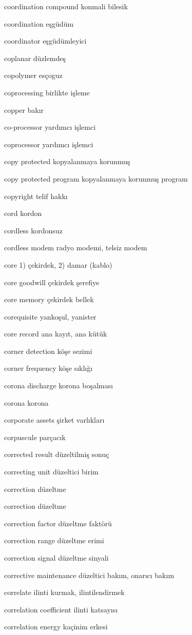 \documentclass[12pt,fleqn]{article}\usepackage{../../common}
\begin{document}
coordination compound konmali bilesik

coordination eşgüdüm

coordinator eşgüdümleyici

coplanar düzlemdeş

copolymer esçoguz

coprocessing birlikte işleme

copper bakır

co-processor yardımcı işlemci

coprocessor yardımcı işlemci

copy protected kopyalanmaya korunmuş

copy protected program kopyalanmaya korunmuş program

copyright telif hakkı

cord kordon

cordless kordonsuz

cordless modem radyo modemi, telsiz modem

core 1) çekirdek, 2) damar (kablo)

core goodwill çekirdek şerefiye

core memory çekirdek bellek

corequisite yankoşul, yanister

core record ana kayıt, ana kütük

corner detection köşe sezimi

corner frequency köşe sıklığı

corona discharge korona boşalması

corona korona

corporate assets şirket varlıkları

corpuscule parçacık

corrected result düzeltilmiş sonuç

correcting unit düzeltici birim

correction düzeltme

correction düzeltme

correction factor düzeltme faktörü

correction range düzeltme erimi

correction signal düzeltme sinyali

corrective maintenance düzeltici bakım, onarıcı bakım

correlate ilinti kurmak, ilintilendirmek

correlation coefficient ilinti katsayısı

correlation energy kaçinim erkesi
\end{document}
